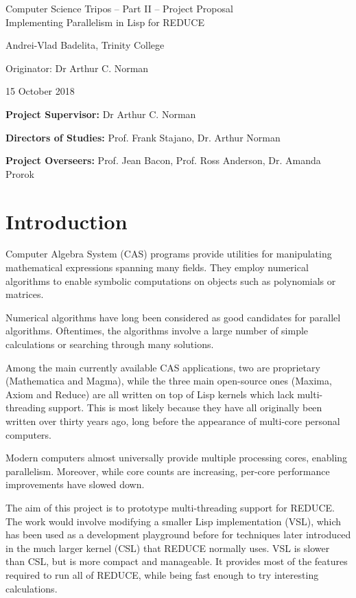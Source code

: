 \documentclass[12pt,a4paper,twoside]{article}
\begin{document}
	
	\begin{center}
		\Large
		Computer Science Tripos -- Part II -- Project Proposal\\[4mm]
		\LARGE
		Implementing Parallelism in Lisp for REDUCE
		
		\large
		Andrei-Vlad Badelita, Trinity College
		
		Originator: Dr Arthur C. Norman
		
		15 October 2018
	\end{center}
	
	\vspace{5mm}
	
	\textbf{Project Supervisor:} Dr Arthur C. Norman
	
	\textbf{Directors of Studies:} Prof. Frank Stajano, Dr. Arthur Norman 
	
	\textbf{Project Overseers:} Prof. Jean Bacon, Prof. Ross Anderson, Dr. Amanda Prorok
	
	
	\section*{Introduction}
	
	Computer Algebra System (CAS) programs provide utilities for manipulating mathematical expressions 
	spanning many fields. They employ  numerical algorithms to enable symbolic computations
	on objects such as polynomials or matrices.
	
	Numerical algorithms have long been considered as good candidates for parallel algorithms.
	Oftentimes, the algorithms involve a large number of simple calculations or searching through
	many solutions.
	
	Among the main currently available CAS applications, two are proprietary (Mathematica and Magma),
	while the three main open-source ones (Maxima, Axiom and Reduce) are all written on top of Lisp
	kernels which lack multi-threading support. This is most likely because they have all originally been
	written over thirty years ago, long before the appearance of multi-core personal computers.
	
	Modern computers almost universally provide multiple processing cores, enabling parallelism.
	Moreover, while core counts are increasing, per-core performance improvements have slowed down.
	
	The aim of this project is to prototype multi-threading support for REDUCE. The work would involve
	modifying a smaller Lisp implementation (VSL), which has been used as a development playground
	before for techniques later introduced in the much larger kernel (CSL) that REDUCE normally uses.
	VSL is slower than CSL, but is more compact and manageable. It provides 
	most of the features required to run all of REDUCE, while being fast enough to try
	interesting calculations.
	
\end{document}
